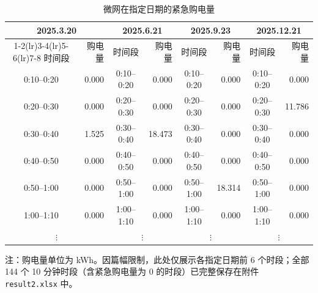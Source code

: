 \begin{table}[H]
\centering
\scriptsize
\setlength{\tabcolsep}{2.5pt}
\caption{微网在指定日期的紧急购电量}
\label{tab:p2-table3-emergency}
\begin{tabular}{@{}crcrcrcr@{}}
\toprule
\multicolumn{2}{c}{2025.3.20} & \multicolumn{2}{c}{2025.6.21} & \multicolumn{2}{c}{2025.9.23} & \multicolumn{2}{c}{2025.12.21} \\
\cmidrule(lr){1-2}\cmidrule(lr){3-4}\cmidrule(lr){5-6}\cmidrule(lr){7-8}
时间段 & 购电量 & 时间段 & 购电量 & 时间段 & 购电量 & 时间段 & 购电量 \\
\midrule
0:10--0:20 & 0.000 & 0:10--0:20 & 0.000 & 0:10--0:20 & 0.000 & 0:10--0:20 & 0.000 \\
0:20--0:30 & 0.000 & 0:20--0:30 & 0.000 & 0:20--0:30 & 0.000 & 0:20--0:30 & 11.786 \\
0:30--0:40 & 1.525 & 0:30--0:40 & 18.473 & 0:30--0:40 & 0.000 & 0:30--0:40 & 0.000 \\
0:40--0:50 & 0.000 & 0:40--0:50 & 0.000 & 0:40--0:50 & 0.000 & 0:40--0:50 & 0.000 \\
0:50--1:00 & 0.000 & 0:50--1:00 & 0.000 & 0:50--1:00 & 18.314 & 0:50--1:00 & 0.000 \\
1:00--1:10 & 0.000 & 1:00--1:10 & 0.000 & 1:00--1:10 & 0.000 & 1:00--1:10 & 0.000 \\
\multicolumn{2}{c}{$\vdots$} & \multicolumn{2}{c}{$\vdots$} & \multicolumn{2}{c}{$\vdots$} & \multicolumn{2}{c}{$\vdots$} \\
\bottomrule
\end{tabular}
\par\vspace{2pt}
\parbox{0.88\textwidth}{\footnotesize 注：购电量单位为 kWh。因篇幅限制，此处仅展示各指定日期前 6 个时段；全部 144 个 10 分钟时段（含紧急购电量为 0 的时段）已完整保存在附件 \texttt{result2.xlsx} 中。}
\end{table}
